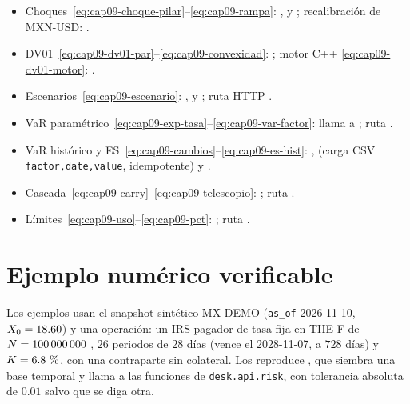 \begin{itemize}
  \item Choques~\eqref{eq:cap09-choque-pilar}--\eqref{eq:cap09-rampa}:
        ,
         y ;
        recalibración de MXN-USD: .
  \item DV01~\eqref{eq:cap09-dv01-par}--\eqref{eq:cap09-convexidad}: ;
        motor C++ \eqref{eq:cap09-dv01-motor}: .
  \item Escenarios~\eqref{eq:cap09-escenario}: ,
         y ;
        ruta HTTP .
  \item VaR paramétrico~\eqref{eq:cap09-exp-tasa}--\eqref{eq:cap09-var-factor}:
         llama a ;
        ruta .
  \item VaR histórico y ES~\eqref{eq:cap09-cambios}--\eqref{eq:cap09-es-hist}:
        , 
        (carga CSV \texttt{factor,date,value}, idempotente) y .
  \item Cascada~\eqref{eq:cap09-carry}--\eqref{eq:cap09-telescopio}: ;
        ruta .
  \item Límites~\eqref{eq:cap09-uso}--\eqref{eq:cap09-pct}: ;
        ruta .
\end{itemize}

\section{Ejemplo numérico verificable}\label{sec:cap09-ejemplo}

Los ejemplos usan el snapshot sintético MX-DEMO (\texttt{as\_of} 2026-11-10, $X_0=18.60$) y una operación: un IRS pagador de tasa fija en TIIE-F de $N=100\,000\,000$ \MXN, $26$ periodos de $28$ días (vence el 2028-11-07, a $728$ días) y $K=6.8~\%$, con una contraparte sin colateral. Los reproduce , que siembra una base temporal y llama a las funciones de \texttt{desk.api.risk}, con tolerancia absoluta de $0.01$ \MXN{} salvo que se diga otra.

